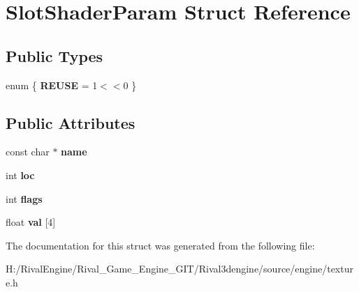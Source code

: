 \hypertarget{struct_slot_shader_param}{}\section{Slot\+Shader\+Param Struct Reference}
\label{struct_slot_shader_param}
\subsection*{Public Types}
\begin{DoxyCompactItemize}
\item 
\mbox{\label{struct_slot_shader_param_aad04e8f3017b2c8c99c0f014e4a751dc}} 
enum \{ {\bfseries R\+E\+U\+SE} = 1$<$$<$0
 \}
\end{DoxyCompactItemize}
\subsection*{Public Attributes}
\begin{DoxyCompactItemize}
\item 
\mbox{\label{struct_slot_shader_param_a16de574cac9886a8fd63042e104d4d4b}} 
const char $\ast$ {\bfseries name}
\item 
\mbox{\label{struct_slot_shader_param_a8b614cafaddd8a0f551d15ca2f2ff66c}} 
int {\bfseries loc}
\item 
\mbox{\label{struct_slot_shader_param_a9595a934d1f9572a007c39d6dc92a12c}} 
int {\bfseries flags}
\item 
\mbox{\label{struct_slot_shader_param_a709dc011b38526e318a009973693aec6}} 
float {\bfseries val} \mbox{[}4\mbox{]}
\end{DoxyCompactItemize}


The documentation for this struct was generated from the following file\+:\begin{DoxyCompactItemize}
\item 
H\+:/\+Rival\+Engine/\+Rival\+\_\+\+Game\+\_\+\+Engine\+\_\+\+G\+I\+T/\+Rival3dengine/source/engine/texture.\+h\end{DoxyCompactItemize}
